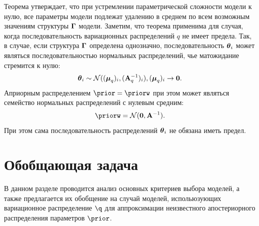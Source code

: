 Теорема утверждает, что при устремлении параметрической сложности модели к нулю, все параметры модели подлежат удалению в среднем по всем возможным значениям  структуры $\boldsymbol{\Gamma}$ модели. Заметим, что теорема применима для случая, когда последовательность вариационных распределений $q$ не имеет предела. Так, в случае, если структура $\boldsymbol{\Gamma}$ определена однозначно, последовательность $\boldsymbol{\theta}_i$ может являться последовательностью нормальных распределений, чье матожидание стремится к нулю:
\[
    \boldsymbol{\theta}_i \sim \mathcal{N}((\boldsymbol{\mu}_q)_i, (\mathbf{A}^{-1}_q)_i), (\boldsymbol{\mu}_q)_i \to \mathbf{0}.
\]
Априорным распределением $\prior = \priorw$ при этом может являться семейство нормальных распределений с нулевым средним:
\[
    \priorw = \mathcal{N}(\mathbf{0}, \A^{-1}).
\]
При этом сама последовательность распределений $\boldsymbol{\theta}_i$ не обязана иметь предел.

\section{Обобщающая задача}
В данном разделе проводится анализ основных критериев выбора моделей, а также предлагается их обобщение на случай моделей, испольюзующих вариационное распределение $\q$ для аппроксимации неизвестного апостериорного распределения параметров $\prior$.

